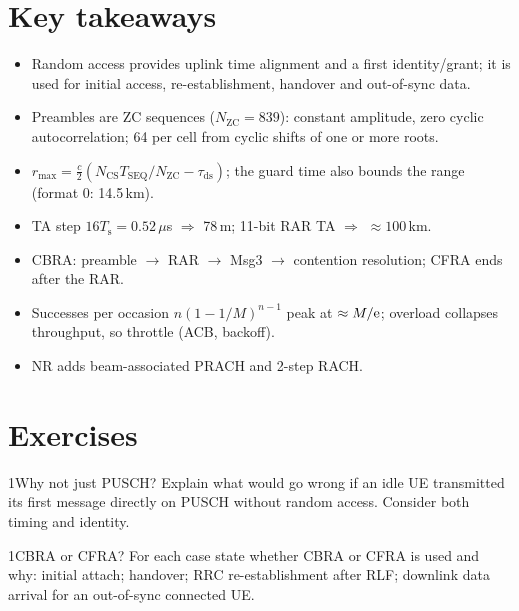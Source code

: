 \documentclass[11pt,a4paper]{article}
\begin{document}
\section{Key takeaways}
\begin{takeawaybox}
\begin{itemize}
  \item Random access provides uplink time alignment and a first identity/grant; it is used for initial
        access, re-establishment, handover and out-of-sync data.
  \item Preambles are ZC sequences ($N_{\mathrm{ZC}} = 839$): constant amplitude, zero cyclic
        autocorrelation; 64 per cell from cyclic shifts of one or more roots.
  \item $r_{\max} = \tfrac{c}{2}(N_{\mathrm{CS}}T_{\mathrm{SEQ}}/N_{\mathrm{ZC}} - \tau_{\mathrm{ds}})$; the guard time also
        bounds the range (format 0: 14.5\,km).
  \item TA step $16T_\mathrm{s} = 0.52\,\mu$s $\Rightarrow$ 78\,m; 11-bit RAR TA $\Rightarrow$ $\approx100$\,km.
  \item CBRA: preamble $\to$ RAR $\to$ Msg3 $\to$ contention resolution; CFRA ends after the RAR.
  \item Successes per occasion $n(1-1/M)^{n-1}$ peak at $\approx M/\mathrm{e}$; overload collapses throughput, so
        throttle (ACB, backoff).
  \item NR adds beam-associated PRACH and 2-step RACH.
\end{itemize}
\end{takeawaybox}

\section{Exercises}

\begin{exercisebox}{1}{Why not just PUSCH?}\label{exr:why}
Explain what would go wrong if an idle UE transmitted its first message directly on PUSCH without
random access. Consider both timing and identity.
\end{exercisebox}

\begin{exercisebox}{1}{CBRA or CFRA?}\label{exr:which}
For each case state whether CBRA or CFRA is used and why: initial attach; handover; RRC re-establishment
after RLF; downlink data arrival for an out-of-sync connected UE.
\end{exercisebox}
\end{document}
